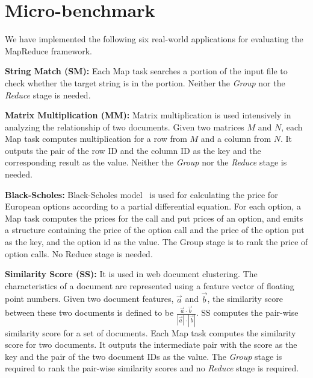 \section{Micro-benchmark}

We have implemented the following six real-world applications for
evaluating the MapReduce framework.

{\bf String Match (SM):} Each Map task searches a portion of the
input file to check whether the target string is in the portion.
Neither the {\em Group} nor the {\em Reduce} stage is needed.

{\bf Matrix Multiplication (MM):} Matrix multiplication is used
intensively in analyzing the relationship of two documents. Given two
matrices $M$ and $N$, each Map task computes multiplication for a
row from $M$ and a column from $N$. It outputs the pair of the row
ID and the column ID as the key and the corresponding result as the
value. Neither the {\em Group} nor the {\em Reduce} stage is needed.


{\bf Black-Scholes:} Black-Scholes model~\cite{Black1973} is used for calculating the price for European options according to a partial differential equation.
For each option, a Map task computes the prices for the call and put prices of an option, and emits a structure containing the price of the option call and the price of the option put as the key, and the option id as the value. The Group stage is to rank the price of option calls. No Reduce stage is needed.


{\bf Similarity Score (SS):} It is used in web document clustering.
The characteristics of a document are represented using a feature
vector of floating point numbers. Given two document features,
$\vec{a}$ and $\vec{b}$, the similarity score between these two
documents is defined to be $\frac{\vec{a}\cdot
\vec{b}}{|\vec{a}|\cdot |\vec{b}|}$. SS computes the pair-wise
similarity score for a set of documents. Each Map task computes the
similarity score for two documents. It outputs the intermediate pair
with the score as the key and the pair of the two document IDs as the
value. The {\em Group} stage is required to rank the pair-wise similarity
scores and no {\em Reduce} stage is required. %

